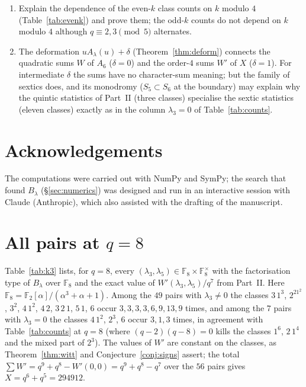 ﻿\documentclass[12pt,a4paper]{amsart}
\theoremstyle{definition}
\newcommand{\F}{\mathbb{F}}
\begin{document}
\begin{enumerate}[label=\textbf{Open Problem \arabic*.},wide,labelindent=0pt,itemsep=0.8ex]
\item Explain the dependence of the even-$k$ class counts on $k$ modulo $4$ (Table~\ref{tab:evenk}) and prove them; the odd-$k$ counts do not depend on $k$ modulo $4$ although $q\equiv2,3\pmod5$ alternates.
\item The deformation $uA_\lambda(u)+\delta$ (Theorem~\ref{thm:deform}) connects the quadratic sums $W$ of $A_6$ ($\delta=0$) and the order-$4$ sums $W'$ of $X$ ($\delta=1$). For intermediate $\delta$ the sums have no character-sum meaning; but the family of sextics does, and its monodromy ($S_5\subset S_6$ at the boundary) may explain why the quintic statistics of Part~II (three classes) specialise the sextic statistics (eleven classes) exactly as in the column $\lambda_3=0$ of Table~\ref{tab:counts}.
\end{enumerate}

\section*{Acknowledgements}
The computations were carried out with NumPy and SymPy; the search that found $B_\lambda$ (\S\ref{sec:numerics}) was designed and run in an interactive session with Claude (Anthropic), which also assisted with the drafting of the manuscript.

\appendix

\section{All pairs at \texorpdfstring{$q=8$}{q=8}}\label{app:k3}
Table~\ref{tab:k3} lists, for $q=8$, every $(\lambda_3,\lambda_5)\in\F_8\times\F_8^\times$ with the factorisation type of $B_\lambda$ over $\F_8$ and the exact value of $W'(\lambda_3,\lambda_5)/q^7$ from Part~II. Here $\F_8=\F_2[\alpha]/(\alpha^3+\alpha+1)$. Among the $49$ pairs with $\lambda_3\ne0$ the classes $3\,1^3$, $2^21^2$, $3^2$, $4\,1^2$, $4\,2$, $3\,2\,1$, $5\,1$, $6$ occur $3,3,3,3,6,9,13,9$ times, and among the $7$ pairs with $\lambda_3=0$ the classes $4\,1^2$, $2^3$, $6$ occur $3,1,3$ times, in agreement with Table~\ref{tab:counts} at $q=8$ (where $(q-2)(q-8)=0$ kills the classes $1^6$, $2\,1^4$ and the mixed part of $2^3$). The values of $W'$ are constant on the classes, as Theorem~\ref{thm:witt} and Conjecture~\ref{conj:signs} assert; the total $\sum W'=q^9+q^8-W'(0,0)=q^9+q^8-q^7$ over the $56$ pairs gives $X=q^6+q^5=294912$.

\begin{table}[H]
\centering
\caption{$q=8$: all pairs $(\lambda_3,\lambda_5)$, the class of $B_\lambda$ and $W'/q^7$ (generated by \texttt{appendix\_table\_k3.py}).}\label{tab:k3}
\footnotesize

\end{table}
\end{document}
